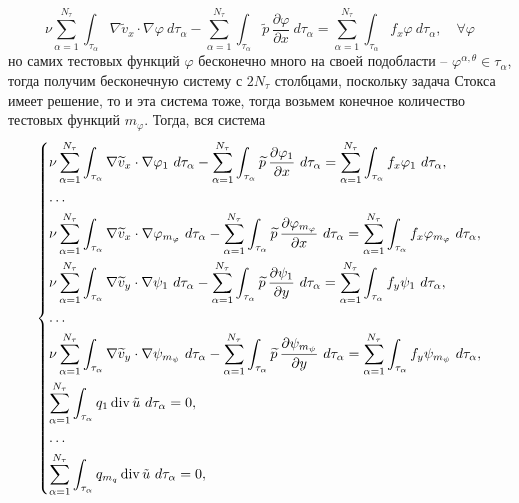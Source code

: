\documentclass[a4paper,14pt]{extarticle}
\begin{document}
	\begin{equation*}
		\nu \sum_{\alpha=1}^{N_{\tau}} \int_{\tau_\alpha}
		\nabla\widetilde v_x\cdot\nabla\varphi ~ d\tau_\alpha 
		-
		\sum_{\alpha=1}^{N_{\tau}} \int_{\tau_\alpha}
		\widetilde p\,\frac{\partial\varphi}{\partial x} ~ d\tau_\alpha
		=
		\sum_{\alpha=1}^{N_{\tau}} \int_{\tau_\alpha}
		f_x\varphi ~ d\tau_\alpha,
		\quad
		\forall\varphi
	\end{equation*}
	но самих тестовых функций $\varphi$ бесконечно много на своей подобласти -- $\varphi^{\alpha,\theta} \in \tau_\alpha$, тогда получим бесконечную систему с $2N_\tau$ столбцами, поскольку задача Стокса имеет решение, то и эта система тоже, тогда возьмем конечное количество тестовых функций $m_\varphi$. Тогда, вся система 
	\begin{equation}
	\begin{dcases}
		\nu \sum_{\alpha=1}^{N_{\tau}} \int_{\tau_\alpha}
		\nabla\widetilde v_x\cdot\nabla\varphi_1 ~ d\tau_\alpha 
		-
		\sum_{\alpha=1}^{N_{\tau}} \int_{\tau_\alpha}
		\widetilde p\,\frac{\partial\varphi_1}{\partial x} ~ d\tau_\alpha
		=
		\sum_{\alpha=1}^{N_{\tau}} \int_{\tau_\alpha}
		f_x\varphi_1 ~ d\tau_\alpha,
		\\
		\dots
		\\
		\nu \sum_{\alpha=1}^{N_{\tau}} \int_{\tau_\alpha}
		\nabla\widetilde v_x\cdot\nabla\varphi_{m_\varphi} ~ d\tau_\alpha 
		-
		\sum_{\alpha=1}^{N_{\tau}} \int_{\tau_\alpha}
		\widetilde p\,\frac{\partial\varphi_{m_\varphi}}{\partial x} ~ d\tau_\alpha
		=
		\sum_{\alpha=1}^{N_{\tau}} \int_{\tau_\alpha}
		f_x\varphi_{m_\varphi} ~ d\tau_\alpha,
		\\
		\nu \sum_{\alpha=1}^{N_{\tau}} \int_{\tau_\alpha}
		\nabla\widetilde v_y\cdot\nabla\psi_{1} ~ d\tau_\alpha 
		-
		\sum_{\alpha=1}^{N_{\tau}} \int_{\tau_\alpha}
		\widetilde p\,\frac{\partial\psi_{1}}{\partial y} ~ d\tau_\alpha
		=
		\sum_{\alpha=1}^{N_{\tau}} \int_{\tau_\alpha}
		f_y\psi_{1} ~ d\tau_\alpha,
		\\
		\dots
		\\
		\nu \sum_{\alpha=1}^{N_{\tau}} \int_{\tau_\alpha}
		\nabla\widetilde v_y\cdot\nabla\psi_{m_\psi} ~ d\tau_\alpha 
		-
		\sum_{\alpha=1}^{N_{\tau}} \int_{\tau_\alpha}
		\widetilde p\,\frac{\partial\psi_{m_\psi}}{\partial y} ~ d\tau_\alpha
		=
		\sum_{\alpha=1}^{N_{\tau}} \int_{\tau_\alpha}
		f_y\psi_{m_\psi} ~ d\tau_\alpha,
		\\
		\sum_{\alpha=1}^{N_{\tau}}\int_{\tau_\alpha}
		q_1\operatorname{div}\tilde u~ d\tau_\alpha = 0,
		\\
		\dots
		\\
		\sum_{\alpha=1}^{N_{\tau}}\int_{\tau_\alpha}
		q_{m_q}\operatorname{div}\tilde u~ d\tau_\alpha = 0,
	\end{dcases}
	\end{equation}
\end{document}
